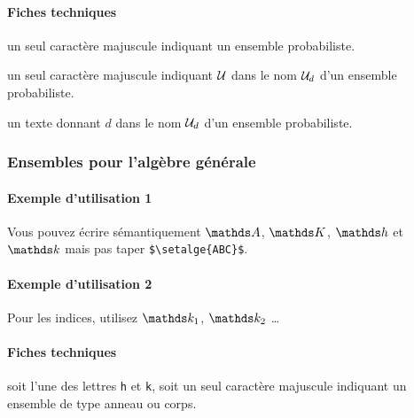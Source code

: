 \documentclass[12pt,a4paper]{article}
\begin{document}
\paragraph{Fiches techniques}


\IDarg{} un seul caractère \ascii{} majuscule indiquant un ensemble probabiliste.


\bigskip



 un seul caractère \ascii{} majuscule indiquant $\setproba{U}$ dans le nom $\setproba*{U}{d}$ d'un ensemble probabiliste.

 un texte donnant $d$ dans le nom $\setproba*{U}{d}$ d'un ensemble probabiliste.



\subsubsection{Ensembles pour l'algèbre générale}

\paragraph{Exemple d'utilisation 1}

\begin{tcblisting}{}
Vous pouvez écrire sémantiquement $\setalge{A}$, $\setalge{K}$, $\setalge{h}$ et
$\setalge{k}$ mais pas taper \verb+$\setalge{ABC}$+.
\end{tcblisting}


\paragraph{Exemple d'utilisation 2}

\begin{tcblisting}{}
Pour les indices, utilisez $\setalge*{k}{1}$, $\setalge*{k}{2}$ \dots
\end{tcblisting}


\paragraph{Fiches techniques}


\IDarg{} soit l'une des lettres  \texttt{h} et \texttt{k}, soit un seul caractère \ascii{} majuscule indiquant un ensemble de type anneau ou corps.
\end{document}
